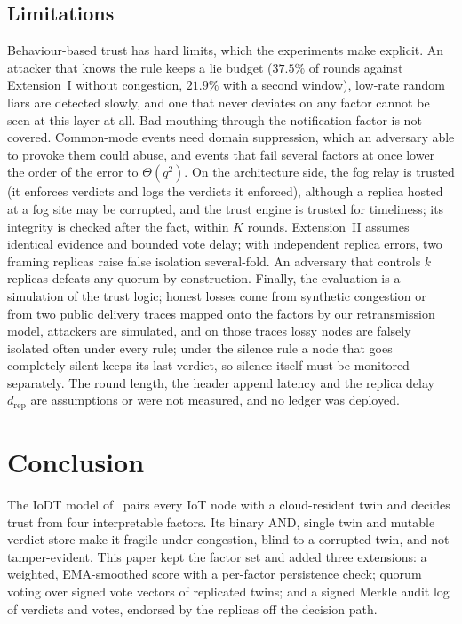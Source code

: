 \documentclass[lineno,pdflatex,sn-nature]{sn-jnl}
\theoremstyle{thmstyleone}%
\theoremstyle{thmstylethree}%
\begin{document}
\subsection{Limitations}
\label{sec:limitations}
Behaviour-based trust has hard limits, which the experiments make
explicit.  An attacker that knows the rule keeps a lie budget
($37.5\%$ of rounds against Extension~I without congestion,
$21.9\%$ with a second window), low-rate random liars are detected
slowly, and one that never deviates on any factor cannot be seen at
this layer at all.  Bad-mouthing through the notification factor is
not covered.  Common-mode events need domain suppression, which an
adversary able to provoke them could abuse, and events that fail
several factors at once lower the order of the error to
$\Theta(q^{2})$.  On the architecture side, the fog relay is trusted
(it enforces verdicts and logs the verdicts it enforced), although a
replica hosted at a fog site may be corrupted, and the trust engine is
trusted for timeliness; its integrity is checked after the fact,
within $K$ rounds.  Extension~II assumes identical evidence and
bounded vote delay; with independent replica errors, two framing
replicas raise false isolation several-fold.  An adversary that controls
$k$ replicas defeats any quorum by construction.  Finally, the
evaluation is a simulation of the trust logic; honest losses come from
synthetic congestion or from two public delivery traces mapped onto the
factors by our retransmission model, attackers are simulated, and on
those traces lossy nodes are falsely isolated often under every rule;
under the silence rule a node that goes completely silent keeps its
last verdict, so silence itself must be monitored separately.
The round length, the header append
latency and the replica delay $d_{\mathrm{rep}}$ are assumptions or
were not measured, and no ledger was deployed.
\section{Conclusion}
\label{sec:conclusion}
The IoDT model of~\cite{soula2024iodt} pairs every IoT node with a
cloud-resident twin and decides trust from four interpretable factors.
Its binary AND, single twin and mutable verdict store make it fragile
under congestion, blind to a corrupted twin, and not tamper-evident.
This paper kept the factor set and added three extensions: a weighted,
EMA-smoothed score with a per-factor persistence check; quorum voting
over signed vote vectors of replicated twins; and a signed Merkle
audit log of verdicts and votes, endorsed by the replicas off the
decision path.
\end{document}
